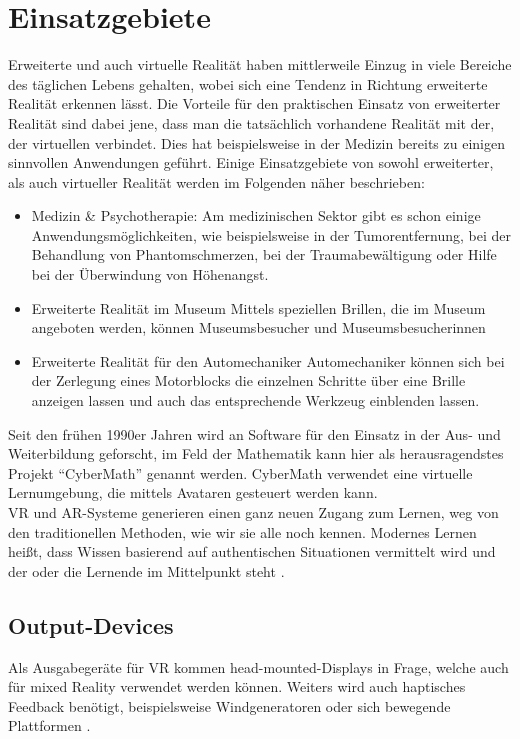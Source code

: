 \documentclass[deutsch]{llncs}
\begin{document}
\section{Einsatzgebiete}
Erweiterte und auch virtuelle Realität haben mittlerweile Einzug in viele Bereiche des täglichen Lebens gehalten, wobei sich eine Tendenz in Richtung erweiterte Realität erkennen lässt. Die Vorteile für den praktischen Einsatz von erweiterter Realität sind dabei jene, dass man die tatsächlich vorhandene Realität mit der, der virtuellen verbindet. Dies hat beispielsweise in der Medizin bereits zu einigen sinnvollen Anwendungen geführt. Einige Einsatzgebiete von sowohl erweiterter, als auch virtueller Realität werden im Folgenden näher beschrieben: 
\begin{itemize}
\item Medizin \& Psychotherapie:
Am medizinischen Sektor gibt es schon einige Anwendungsmöglichkeiten, wie beispielsweise in der Tumorentfernung, bei der Behandlung von Phantomschmerzen, bei der Traumabewältigung oder Hilfe bei der Überwindung von Höhenangst. 

\item Erweiterte Realität im Museum
Mittels speziellen Brillen, die im Museum angeboten werden, können Museumsbesucher und Museumsbesucherinnen 
\item Erweiterte Realität für den Automechaniker
Automechaniker können sich bei der Zerlegung eines Motorblocks die einzelnen Schritte über eine Brille anzeigen lassen und auch das entsprechende Werkzeug einblenden lassen.

\end{itemize}
Seit den frühen 1990er Jahren wird an Software für den Einsatz in der Aus- und Weiterbildung geforscht, im Feld der Mathematik kann hier als herausragendstes Projekt ``CyberMath'' genannt werden. CyberMath verwendet eine virtuelle Lernumgebung, die mittels Avataren gesteuert werden kann. \\
VR und AR-Systeme generieren einen ganz neuen Zugang zum Lernen, weg von den traditionellen Methoden, wie wir sie alle noch kennen. Modernes Lernen heißt, dass Wissen basierend auf authentischen Situationen vermittelt wird und der oder die Lernende im Mittelpunkt steht \cite{Klampfer}.
\cite{unknown}
\subsection{Output-Devices}
Als Ausgabegeräte für VR kommen head-mounted-Displays in Frage, welche auch für mixed Reality verwendet werden können. Weiters wird auch haptisches Feedback benötigt, beispielsweise Windgeneratoren oder sich bewegende Plattformen \cite{Klampfer}.
\end{document}
